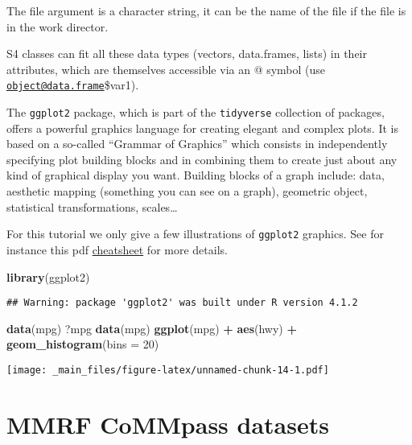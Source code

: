 \documentclass[
]{book}
\newenvironment{Shaded}{\begin{snugshade}}{\end{snugshade}}
\newcommand{\AttributeTok}[1]{\textcolor[rgb]{0.13,0.29,0.53}{#1}}
\newcommand{\DecValTok}[1]{\textcolor[rgb]{0.00,0.00,0.81}{#1}}
\newcommand{\FunctionTok}[1]{\textcolor[rgb]{0.13,0.29,0.53}{\textbf{#1}}}
\newcommand{\NormalTok}[1]{#1}
\newcommand{\SpecialCharTok}[1]{\textcolor[rgb]{0.81,0.36,0.00}{\textbf{#1}}}
\begin{document}
The file argument is a character string, it can be the name of the file if the file is in the work director.

S4 classes can fit all these data types (vectors, data.frames, lists) in their attributes, which are themselves accessible via an @ symbol (use \href{mailto:object@data.frame}{\nolinkurl{object@data.frame}}\$var1).

The \texttt{ggplot2} package, which is part of the \texttt{tidyverse} collection of packages, offers a powerful graphics language for creating elegant and complex plots. It is based on a so-called ``Grammar of Graphics'' which consists in independently specifying plot building blocks and in combining them to create just about any kind of graphical display you want. Building blocks of a graph include: data, aesthetic mapping (something you can see on a graph), geometric object, statistical transformations, scales\ldots{}

For this tutorial we only give a few illustrations of \texttt{ggplot2} graphics. See for instance this pdf \href{https://rstudio.github.io/cheatsheets/data-visualization.pdf}{cheatsheet} for more details.

\begin{Shaded}
\begin{Highlighting}[]
\FunctionTok{library}\NormalTok{(ggplot2)}
\end{Highlighting}
\end{Shaded}

\begin{verbatim}
## Warning: package 'ggplot2' was built under R version 4.1.2
\end{verbatim}

\begin{Shaded}
\begin{Highlighting}[]
\FunctionTok{data}\NormalTok{(mpg)}
\NormalTok{?mpg}
\FunctionTok{data}\NormalTok{(mpg)}
\FunctionTok{ggplot}\NormalTok{(mpg) }\SpecialCharTok{+}  \FunctionTok{aes}\NormalTok{(hwy) }\SpecialCharTok{+} \FunctionTok{geom\_histogram}\NormalTok{(}\AttributeTok{bins =} \DecValTok{20}\NormalTok{)}
\end{Highlighting}
\end{Shaded}

\texttt{[image: \_main\_files/figure-latex/unnamed-chunk-14-1.pdf]}

\hypertarget{mmrf-commpass-datasets}{%
\chapter{MMRF CoMMpass datasets}\label{mmrf-commpass-datasets}}
\end{document}
